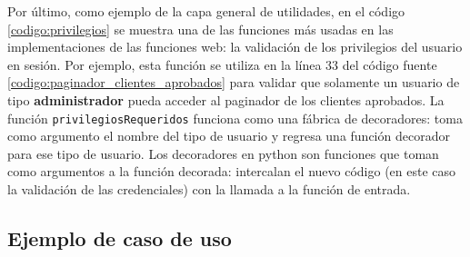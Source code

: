 
Por último, como ejemplo de la capa general de utilidades, en el código \ref{codigo:privilegios} se muestra una de las funciones más usadas en las implementaciones de las funciones web: la validación de los privilegios del usuario en sesión. Por ejemplo, esta función se utiliza en la línea 33 del código fuente \ref{codigo:paginador_clientes_aprobados} para validar que solamente un usuario de tipo \textbf{administrador} pueda acceder al paginador de los clientes aprobados. La función \texttt{privilegiosRequeridos} funciona como una fábrica de decoradores: toma como argumento el nombre del tipo de usuario y regresa una función decorador para ese tipo de usuario. Los decoradores en python son funciones que toman como argumentos a la función decorada: intercalan el nuevo código (en este caso la validación de las credenciales) con la llamada a la función de entrada.


\subsection{Ejemplo de caso de uso}
